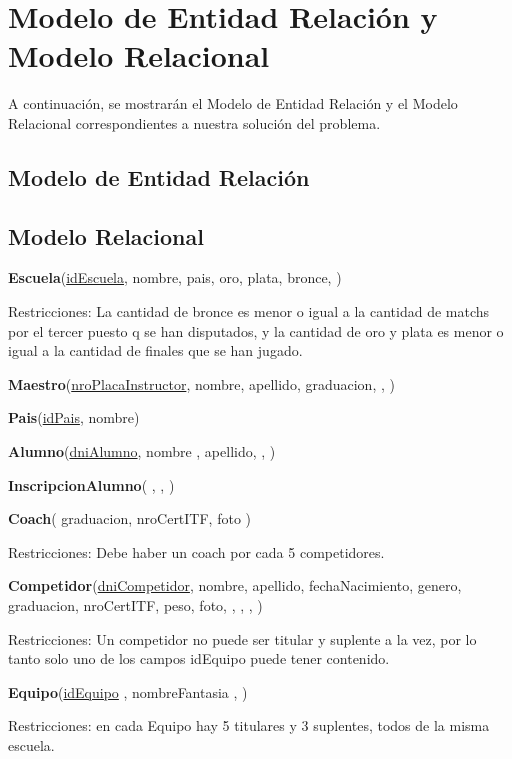 \section{Modelo de Entidad Relación y Modelo Relacional}

A continuación, se mostrarán el Modelo de Entidad Relación y el Modelo Relacional correspondientes a nuestra solución del problema.

\subsection{Modelo de Entidad Relación}

\subsection{Modelo Relacional}


\textbf{Escuela}(\uline{idEscuela}, nombre, pais, oro, plata, bronce, )

Restricciones: La cantidad de bronce es menor o igual a la cantidad de matchs por el tercer puesto q se han disputados, y la cantidad de oro y plata es menor o igual a la cantidad de finales que se han jugado.

\textbf{Maestro}(\uline{nroPlacaInstructor}, nombre, apellido, graduacion, , )

\textbf{Pais}(\uline{idPais}, nombre)

\textbf{Alumno}(\uline{dniAlumno}, nombre , apellido,  , )

\textbf{InscripcionAlumno}( ,  , )

\textbf{Coach}( graduacion, nroCertITF, foto )

Restricciones: Debe haber un coach por cada 5 competidores.

\textbf{Competidor}(\uline{dniCompetidor}, nombre, apellido, fechaNacimiento, genero, graduacion, nroCertITF, peso, foto,  ,  ,  ,  )

Restricciones: Un competidor no puede ser titular y suplente a la vez, por lo tanto solo uno de los campos idEquipo puede tener contenido.

\textbf{Equipo}(\uline{idEquipo} , nombreFantasia ,  )

Restricciones: en cada Equipo hay 5 titulares y 3 suplentes, todos de la misma escuela.

